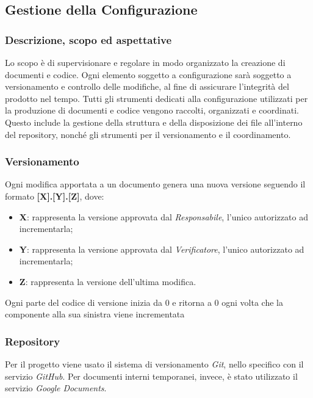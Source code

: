\subsection{Gestione della Configurazione}

\subsubsection{Descrizione, scopo ed aspettative}
    Lo scopo è di supervisionare e regolare in modo organizzato la creazione di 
    documenti e codice. Ogni elemento soggetto a configurazione sarà soggetto a versionamento
    e controllo delle modifiche, al fine di assicurare l'integrità del prodotto 
    nel tempo.
    Tutti gli strumenti dedicati alla configurazione utilizzati per la produzione
    di documenti e codice vengono raccolti, organizzati e coordinati. Questo include
    la gestione della struttura e della disposizione dei file all'interno del repository, 
    nonché gli strumenti per il versionamento e il coordinamento.

\subsubsection{Versionamento}
Ogni modifica apportata a un documento genera una nuova versione seguendo il formato
\textbf{[X].[Y].[Z]}, dove:
\begin{itemize}
    \item \textbf{X}: rappresenta la versione approvata dal \emph{Responsabile}, l'unico autorizzato ad incrementarla;
    \item \textbf{Y}: rappresenta la versione approvata dal \emph{Verificatore}, l'unico autorizzato ad incrementarla;
    \item \textbf{Z}: rappresenta la versione dell'ultima modifica.
\end{itemize}
Ogni parte del codice di versione inizia da 0 e ritorna a 0 ogni volta che la componente alla sua sinistra
viene incrementata
\subsubsection{Repository}
    Per il progetto viene usato il sistema di versionamento \emph{Git}, nello specifico con 
    il servizio \emph{GitHub}. Per documenti interni temporanei, invece, è stato utilizzato il servizio 
    \emph{Google Documents}.

